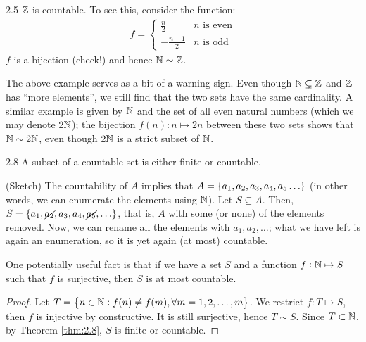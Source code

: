 \begin{example}{}{2.5}
    $\mathbb{Z}$ is countable. To see this, consider the function:
    \begin{align*}
        f = \begin{cases}
            \frac{n}{2} & \text{$n$ is even}
            \\ -\frac{n-1}{2} & \text{$n$ is odd}
            \end{cases}
    \end{align*}
    $f$ is a bijection (check!) and hence $\mathbb{N} \sim \mathbb{Z}$. 
\end{example}
\noindent The above example serves as a bit of a warning sign. Even though $\mathbb{N} \subsetneq \mathbb{Z}$ and $\mathbb{Z}$ has ``more elements'', we still find that the two sets have the same cardinality. A similar example is given by $\mathbb{N}$ and the set of all even natural numbers (which we may denote $2\mathbb{N}$); the bijection $f(n): n \mapsto 2n$ between these two sets shows that $\mathbb{N} \sim 2\mathbb{N}$, even though $2\mathbb{N}$ is a strict subset of $\mathbb{N}$. 
\setcounter{rudin}{7}

\begin{theorem}{}{2.8}
    A subset of a countable set is either finite or countable.
\end{theorem}
\begin{nproof}
    (Sketch) The countability of $A$ implies that $A = \set{a_1, a_2, a_3, a_4, a_5 \ldots}$ (in other words, we can enumerate the elements using $\mathbb{N}$). Let $S \subseteq A$. Then, $S = \set{a_1, \cancel{a_2}, a_3, a_4, \cancel{a_5}, \ldots}$, that is, $A$ with some (or none) of the elements removed. Now, we can rename all the elements with $a_1, a_2, \ldots$; what we have left is again an enumeration, so it is yet again (at most) countable.
\end{nproof}
\noindent One potentially useful fact is that if we have a set $S$ and a function $f: \mathbb{N} \mapsto S$ such that $f$ is surjective, then $S$ is at most countable. 

\begin{proof}
    Let $T = \set{n \in \mathbb{N}: f(n) \neq f(m), \forall m = 1, 2, \ldots, m}$. We restrict $f: T \mapsto S$, then $f$ is injective by constructive. It is still surjective, hence $T \sim S$. Since $T \subset \mathbb{N}$, by Theorem \ref{thm:2.8}, $S$ is finite or countable.
\end{proof}

\setcounter{rudin}{11}


